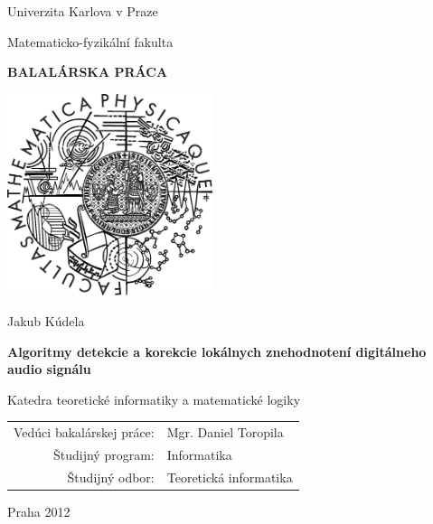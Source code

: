 \begin{titlepage}
\begin{center}

\large
Univerzita Karlova v Praze

\medskip

Matematicko-fyzikální fakulta

\vfill

{\Large \textbf{BALALÁRSKA PRÁCA}}

\vfill

\includegraphics[width=60mm]{images/mff_logo.eps}

\vfill
\vspace{5mm}

{\LARGE Jakub Kúdela}

\vspace{15mm}

{\LARGE \textbf{Algoritmy detekcie a korekcie lokálnych znehodnotení digitálneho audio signálu}}

\vfill

Katedra teoretické informatiky a matematické logiky

\vfill

\begin{tabular}{rl}
Vedúci bakalárskej práce: & Mgr. Daniel Toropila\\
\noalign{\vspace{2mm}}
Študijný program: & Informatika\\
\noalign{\vspace{2mm}}
Študijný odbor: & Teoretická informatika\\
\end{tabular}

\vfill

Praha 2012

\end{center}
\end{titlepage}